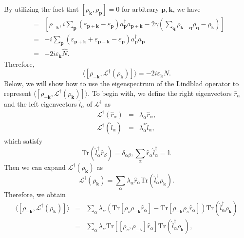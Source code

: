 \documentclass[aps,superscriptaddress,notitlepage,longbibliography]{revtex4-1}
\begin{document}
By utilizing the fact that $[\rho_{\bm{k}},\rho_{\bm{p}}]=0$ for
arbitrary $\bm{p},\bm{k}$, we have 
\begin{eqnarray}
[\rho_{-\bm{k}},\mathcal{L}^{\dagger}(\rho_{\bm{k}})] & = & \left[\rho_{-\bm{k}},i\sum_{\bm{p}}(\varepsilon_{\bm{p}+\bm{k}}-\varepsilon_{\bm{p}})a_{\bm{p}}^{\dagger}a_{\bm{p}+\bm{k}}-2\gamma\left(\sum_{\bm{q}}\rho_{\bm{k}-\bm{q}}\rho_{\bm{q}}-\rho_{\bm{k}}\right)\right]\nonumber \\
 & = & -i\sum_{\bm{p}}(\varepsilon_{\bm{p}+\bm{k}}+\varepsilon_{\bm{p}-\bm{k}}-\varepsilon_{\bm{p}})a_{\bm{p}}^{\dagger}a_{\bm{p}}\nonumber \\
 & = & -2i\varepsilon_{\bm{k}}\hat{N}.
\end{eqnarray}
Therefore, 
\begin{equation}
\langle[\rho_{-\bm{k}},\mathcal{L}^{\dagger}(\rho_{\bm{k}})]\rangle=-2i\varepsilon_{\bm{k}}N.
\end{equation}
Below, we will show how to use the eigenspectrum of the Lindblad operator
to represent $\langle[\rho_{-\bm{k}},\mathcal{L}^{\dagger}(\rho_{\bm{k}})]\rangle$.
To begin with, we define the right eigenvectors $\hat{r}_{\alpha}$
and the left eigenvectors $\hat{l}_{\alpha}$ of $\mathcal{L}^{\dagger}$
as \citep{Scarlatella2019} 
\begin{eqnarray}
\mathcal{L}^{\dagger}(\hat{r}_{\alpha}) & = & \lambda_{\alpha}\hat{r}_{\alpha},\\
\mathcal{L}^{\dagger}(\hat{l}_{\alpha}) & = & \lambda_{\alpha}^{\ast}\hat{l}_{\alpha},
\end{eqnarray}
which satisfy 
\begin{equation}
\text{Tr}(\hat{l}_{\alpha}^{\dagger}\hat{r}_{\beta})=\delta_{\alpha\beta},\sum_{\alpha}\hat{r}_{\alpha}\hat{l}_{\alpha}^{\dagger}=\mathbb{I}.
\end{equation}
Then we can expand $\mathcal{L}^{\dagger}(\rho_{\bm{k}})$ as 
\begin{equation}
\mathcal{L}^{\dagger}(\rho_{\bm{k}})=\sum_{\alpha}\lambda_{\alpha}\hat{r}_{\alpha}\text{Tr}(\hat{l}_{\alpha}^{\dagger}\rho_{\bm{k}}).
\end{equation}
Therefore, we obtain 
\begin{eqnarray}
\langle[\rho_{-\bm{k}},\mathcal{L}^{\dagger}(\rho_{\bm{k}})]\rangle & = & \sum_{\alpha}\lambda_{\alpha}(\text{Tr}[\rho_{s}\rho_{-\bm{k}}\hat{r}_{\alpha}]-\text{Tr}[\rho_{-\bm{k}}\rho_{s}\hat{r}_{\alpha}])\text{Tr}(\hat{l}_{\alpha}^{\dagger}\rho_{\bm{k}})\nonumber \\
 & = & \sum_{\alpha}\lambda_{\alpha}\text{Tr}[[\rho_{s},\rho_{-\bm{k}}]\hat{r}_{\alpha}]\text{Tr}(\hat{l}_{\alpha}^{\dagger}\rho_{\bm{k}}),
\end{eqnarray}
\end{document}
